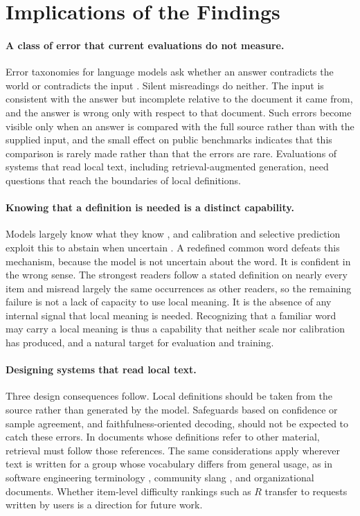 \section{Implications of the Findings}
\label{sec:discussion}
\paragraph{A class of error that current evaluations do not measure.}
Error taxonomies for language models ask whether an answer contradicts the world or contradicts the input \citep{space}. Silent misreadings do neither. The input is consistent with the answer but incomplete relative to the document it came from, and the answer is wrong only with respect to that document. Such errors become visible only when an answer is compared with the full source rather than with the supplied input, and the small effect on public benchmarks indicates that this comparison is rarely made rather than that the errors are rare. Evaluations of systems that read local text, including retrieval-augmented generation, need questions that reach the boundaries of local definitions.

\paragraph{Knowing that a definition is needed is a distinct capability.}
Models largely know what they know \citep{know-what-know}, and calibration and selective prediction exploit this to abstain when uncertain \citep{calibration,selective}. A redefined common word defeats this mechanism, because the model is not uncertain about the word. It is confident in the wrong sense. The strongest readers follow a stated definition on nearly every item and misread largely the same occurrences as other readers, so the remaining failure is not a lack of capacity to use local meaning. It is the absence of any internal signal that local meaning is needed. Recognizing that a familiar word may carry a local meaning is thus a capability that neither scale nor calibration has produced, and a natural target for evaluation and training.

\paragraph{Designing systems that read local text.}
Three design consequences follow. Local definitions should be taken from the source rather than generated by the model. Safeguards based on confidence or sample agreement, and faithfulness-oriented decoding, should not be expected to catch these errors. In documents whose definitions refer to other material, retrieval must follow those references. The same considerations apply wherever text is written for a group whose vocabulary differs from general usage, as in software engineering terminology \citep{se-terminology}, community slang \citep{informal-language}, and organizational documents. Whether item-level difficulty rankings such as $R$ transfer to requests written by users is a direction for future work.
